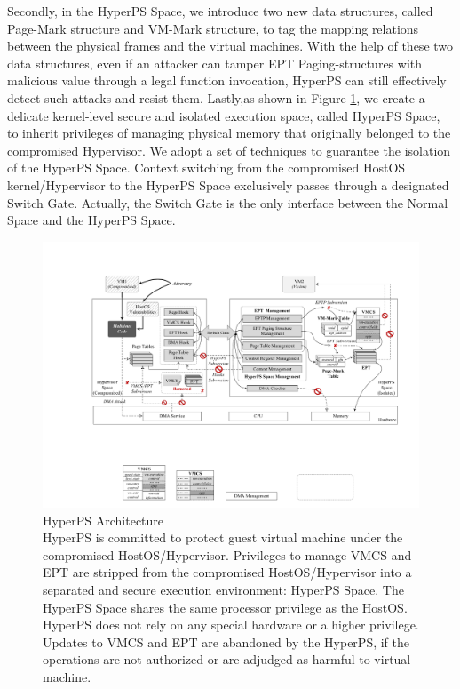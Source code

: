 Secondly, in the HyperPS Space, we introduce two new data structures, called Page-Mark structure and VM-Mark structure, to tag the mapping relations between the physical frames and the virtual machines. With the help of these two data structures, even if an attacker can tamper EPT Paging-structures with malicious value through a legal function invocation, HyperPS can still effectively detect such attacks and resist them.
Lastly,as shown in Figure \ref{fig:design}, we create a delicate kernel-level secure and isolated execution space, called HyperPS Space, to inherit privileges of managing physical memory that originally belonged to the compromised Hypervisor. We adopt a set of techniques to guarantee the isolation of the HyperPS Space. Context switching from the compromised HostOS kernel/Hypervisor to the HyperPS Space exclusively passes through a designated Switch Gate. Actually, the Switch Gate is the only interface between the Normal Space and the HyperPS Space.


\begin{figure}[htpb]
    \centering
    \includegraphics[width=0.9\linewidth]{IMG/newdesign.pdf}
    \caption{HyperPS Architecture  \\ HyperPS is committed to protect guest virtual machine under the compromised HostOS/Hypervisor. Privileges to manage VMCS and EPT are stripped from the compromised HostOS/Hypervisor into a separated and secure execution environment: HyperPS Space. The HyperPS Space shares the same processor privilege as the HostOS. HyperPS does not rely on any special hardware or a higher privilege. Updates to VMCS and EPT are abandoned by the HyperPS, if the operations are not authorized or are adjudged as harmful to virtual machine.}%
    \label{fig:design}
\end{figure}



